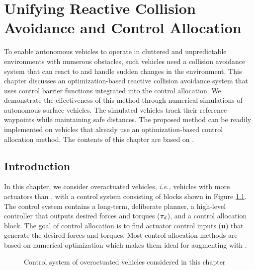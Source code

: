 \chapter{Unifying Reactive Collision Avoidance and Control Allocation}
\label{chap:collision_avoidance}

To enable autonomous vehicles to operate in cluttered and unpredictable environments with numerous obstacles, such vehicles need a collision avoidance system that can react to and handle sudden changes in the environment.
This chapter discusses an optimization-based reactive collision avoidance system that uses control barrier functions integrated into the control allocation.
We demonstrate the effectiveness of this method through numerical simulations of autonomous surface vehicles. The simulated vehicles track their reference waypoints while maintaining safe distances.
The proposed method can be readily implemented on vehicles that already use an optimization-based control allocation method.
The contents of this chapter are based on \cite{matous_unifying_2021}.

\section{Introduction}
In this chapter, we consider overactuated vehicles, \emph{i.e.,} vehicles with more actuators than , with a control system consisting of blocks shown in Figure \ref{fig:ccta_diagram}.
The control system contains a long-term, deliberate planner, a high-level controller that outputs desired forces and torques ($\bm{\tau}_d$), and a control allocation block.
The goal of control allocation is to find actuator control inputs ($\mathbf{u}$) that generate the desired forces and torques.
Most control allocation methods are based on numerical optimization \cite{oppenheimer_control_2006,harkegard_dynamic_2004,johansen_constrained_2004} which makes them ideal for augmenting with .

\begin{figure}[t]
    \centering
    
    \vspace{-1mm}
    \caption{Control system of overactuated vehicles considered in this chapter}
    \label{fig:ccta_diagram}
\end{figure}

